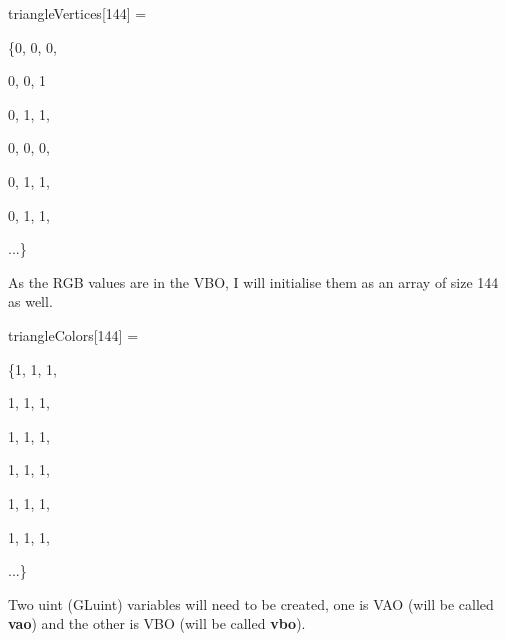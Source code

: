 \documentclass[10pt]{report}
\begin{document}
triangleVertices[144] = 

\{0, 0, 0,

0, 0, 1

0, 1, 1,

0, 0, 0,

0, 1, 1,

0, 1, 1,

...\}


As the RGB values are in the VBO, I will initialise them as an array of size 144 as well.

triangleColors[144] = 

\{1, 1, 1,

1, 1, 1,

1, 1, 1,

1, 1, 1,

1, 1, 1,

1, 1, 1, 

...\}


Two uint (GLuint) variables will need to be created, one is VAO (will be called \textbf{vao}) and the other is VBO (will be called \textbf{vbo}).
\end{document}
